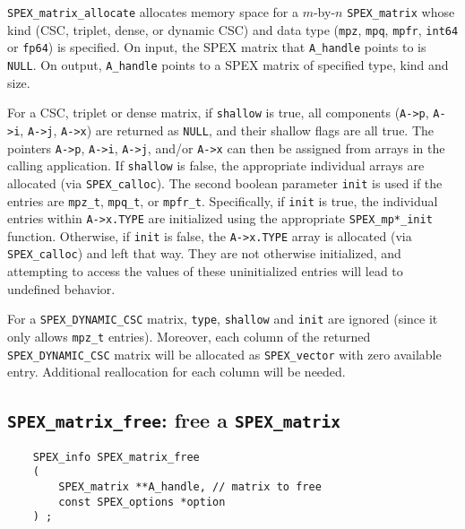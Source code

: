 \documentclass[12pt,oneside]{book}
\theoremstyle{definition}
\begin{document}
\verb|SPEX_matrix_allocate| allocates memory space for a $m$-by-$n$
\verb|SPEX_matrix| whose kind (CSC, triplet, dense, or dynamic CSC) and data type
(\verb|mpz|, \verb|mpq|, \verb|mpfr|, \verb|int64| or \verb|fp64|) is
specified. On input, the SPEX matrix that \verb|A_handle| points to is \verb|NULL|. 
On output, \verb|A_handle| points to a SPEX matrix of specified type, kind and size.

For a CSC, triplet or dense matrix, if \verb|shallow| is true, all components (\verb|A->p|, \verb|A->i|,
\verb|A->j|, \verb|A->x|) are returned as \verb|NULL|, and their shallow flags
are all true.  The pointers \verb|A->p|, \verb|A->i|, \verb|A->j|,
and/or \verb|A->x| can then be assigned from arrays in the calling application.
If \verb|shallow| is false, the appropriate individual arrays are allocated
(via \verb|SPEX_calloc|). The second boolean parameter \verb|init| is used if the entries
are \verb|mpz_t|, \verb|mpq_t|, or \verb|mpfr_t|. Specifically, if \verb|init|
is true, the individual entries within \verb|A->x.TYPE| are initialized using
the appropriate \verb|SPEX_mp*_init| function. Otherwise, if \verb|init| is
false, the \verb|A->x.TYPE| array is allocated (via \verb|SPEX_calloc|) and
left that way.  They are not otherwise initialized, and attempting to access
the values of these uninitialized entries will lead to undefined behavior.

For a \verb|SPEX_DYNAMIC_CSC| matrix, \verb|type|, \verb|shallow| and \verb|init| are ignored (since it only allows \verb|mpz_t| entries). Moreover, each column of the returned  \verb|SPEX_DYNAMIC_CSC| matrix will be
allocated as \verb|SPEX_vector| with zero available entry. Additional reallocation
for each column will be needed.


\newpage
\subsection{\texttt{SPEX\_matrix\_free}: free a \texttt{SPEX\_matrix}} \label{s:user:matrix_free}
\begin{mdframed}[userdefinedwidth=\textwidth]
{\footnotesize
\begin{verbatim}
    SPEX_info SPEX_matrix_free
    (
        SPEX_matrix **A_handle, // matrix to free
        const SPEX_options *option
    ) ;
\end{verbatim}
} \end{mdframed}
\end{document}
